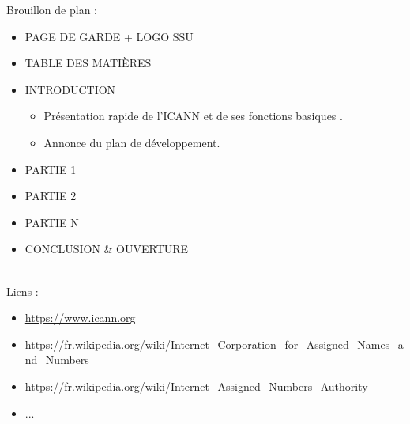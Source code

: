 \documentclass{article}
\begin{document}
Brouillon de plan :\\
\begin{itemize}
	\item PAGE DE GARDE + LOGO SSU
	\item TABLE DES MATIÈRES
	\item INTRODUCTION
	\begin{itemize}
		\item Présentation rapide de l'ICANN et de ses fonctions basiques .
		\item Annonce du plan de développement.
	\end{itemize}
	\item PARTIE 1
	\item PARTIE 2
	\item PARTIE N
	\item CONCLUSION \& OUVERTURE\\\\
\end{itemize}



Liens :\\
\begin{itemize}
	\item \url{https://www.icann.org}
	\item \url{https://fr.wikipedia.org/wiki/Internet_Corporation_for_Assigned_Names_and_Numbers}
	\item \url{https://fr.wikipedia.org/wiki/Internet_Assigned_Numbers_Authority}
	\item ...
\end{itemize}
\end{document}

